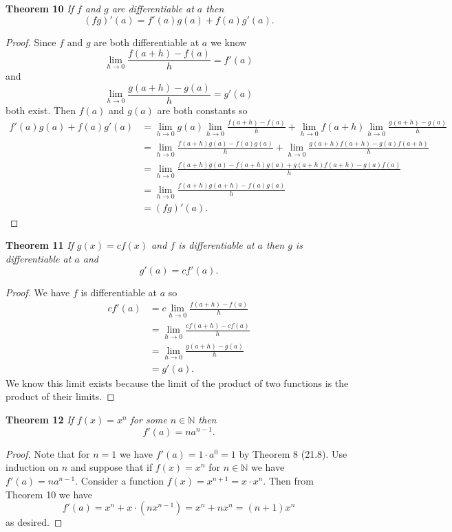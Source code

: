 \documentclass{article}
\begin{document}
\begin{flushleft}
\textbf{Theorem 10}
\textsl{If $f$ and $g$ are differentiable at $a$ then
\[
(fg)'(a) = f'(a)g(a) + f(a)g'(a).
\]}
\begin{proof}
Since $f$ and $g$ are both differentiable at $a$ we know
\[
\lim_{h \rightarrow 0} \frac{f(a+h) - f(a)}{h} = f'(a)
\]
and
\[
\lim_{h \rightarrow 0} \frac{g(a+h) - g(a)}{h} = g'(a)
\]
both exist. Then $f(a)$ and $g(a)$ are both constants so
\begin{align*}
f'(a)g(a) + f(a)g'(a) &= \lim_{h \rightarrow 0} g(a) \lim_{h \rightarrow 0} \frac{f(a+h) - f(a)}{h} + \lim_{h \rightarrow 0} f(a+h) \lim_{h \rightarrow 0} \frac{g(a+h) - g(a)}{h} \\
	&= \lim_{h \rightarrow 0} \frac{f(a+h)g(a) - f(a)g(a)}{h} + \lim_{h \rightarrow 0} \frac{g(a+h)f(a+h) - g(a)f(a+h)}{h} \\
	&= \lim_{h \rightarrow 0} \frac{f(a+h)g(a) - f(a+h)g(a) + g(a+h)f(a+h) - g(a)f(a)}{h} \\
	&= \lim_{h \rightarrow 0} \frac{f(a+h)g(a+h) - f(a)g(a)}{h} \\
	&= (fg)'(a).
\end{align*}
\end{proof}
	
\textbf{Theorem 11}
\textsl{If $g(x) = cf(x)$ and $f$ is differentiable at $a$ then $g$ is differentiable at $a$ and
\[
g'(a) = cf'(a).
\]}
\begin{proof}
We have $f$ is differentiable at $a$ so
\begin{align*}
cf'(a) &= c \lim_{h \rightarrow 0} \frac{f(a+h) - f(a)}{h} \\
	 &= \lim_{h \rightarrow 0} \frac{cf(a+h) - cf(a)}{h} \\
	 &= \lim_{h \rightarrow 0} \frac{g(a+h) - g(a)}{h} \\
	 &= g'(a).
\end{align*}
We know this limit exists because the limit of the product of two functions is the product of their limits.
\end{proof}

\textbf{Theorem 12}
\textsl{If $f(x) = x^n$ for some $n \in \mathbb{N}$ then
\[
f'(a) = na^{n-1}.
\]}
\begin{proof}
Note that for $n = 1$ we have $f'(a) = 1 \cdot a^0 = 1$ by Theorem 8 (21.8). Use induction on $n$ and suppose that if $f(x) = x^n$ for $n \in \mathbb{N}$ we have $f'(a) = na^{n-1}$. Consider a function $f(x) = x^{n+1} = x \cdot x^n$. Then from Theorem 10 we have
\[
f'(a) = x^n + x \cdot (nx^{n-1}) = x^n + nx^n = (n+1)x^n
\]
as desired.
\end{proof}


\end{flushleft}
\end{document}
